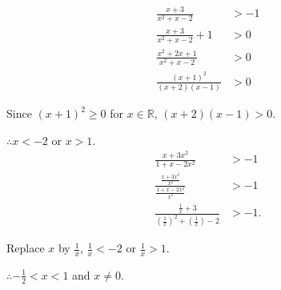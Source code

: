 \item {}
\begin{align*}
\frac{x+3}{x^{2}+x-2} & >-1\\
\frac{x+3}{x^{2}+x-2}+1 & >0\\
\frac{x^{2}+2x+1}{x^{2}+x-2} & >0\\
\frac{\left(x+1\right)^{2}}{\left(x+2\right)\left(x-1\right)} & >0
\end{align*}

Since $\left(x+1\right)^{2}\geq0$ for $x\in\mathbb{R}$, $\left(x+2\right)\left(x-1\right)>0$. 

$\therefore x<-2$ or $x>1$.
\begin{align*}
\frac{x+3x^{2}}{1+x-2x^{2}} & >-1\\
\frac{\frac{x+3x^{2}}{x^{2}}}{\frac{1+x-2x^{2}}{x^{2}}} & >-1\\
\frac{\frac{1}{x}+3}{\left(\frac{1}{x}\right)^{2}+\left(\frac{1}{x}\right)-2} & >-1.
\end{align*}

Replace $x$ by $\frac{1}{x}$, $\frac{1}{x}<-2$ or $\frac{1}{x}>1$. 

$\therefore-\frac{1}{2}<x<1$ and $x\ne0$.